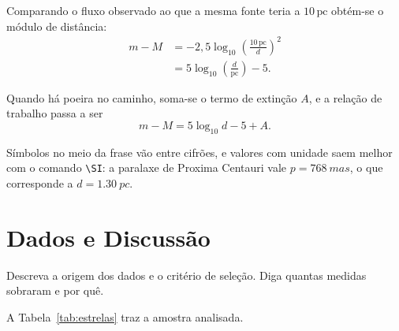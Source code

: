 \documentclass[10pt,a4paper,twocolumn]{article}
\begin{document}
Comparando o fluxo observado ao que a mesma fonte teria a $10\,\mathrm{pc}$
obtém-se o módulo de distância:
\begin{align}
    m - M &= -2{,}5\log_{10}\left(\frac{10\,\mathrm{pc}}{d}\right)^{2}
    \nonumber \\
          &= 5\log_{10}\left(\frac{d}{\mathrm{pc}}\right) - 5.
    \label{eq:modulo}
\end{align}

Quando há poeira no caminho, soma-se o termo de extinção $A$, e a relação
de trabalho passa a ser
\begin{equation*}
    m - M = 5\log_{10}d - 5 + A .
\end{equation*}

Símbolos no meio da frase vão entre cifrões, e valores com unidade saem
melhor com o comando \verb|\SI|: a paralaxe de Proxima Centauri vale
$p = \SI{768}{mas}$, o que corresponde a $d = \SI{1.30}{pc}$.

\section{Dados e Discussão}
\label{sec:dados}

Descreva a origem dos dados e o critério de seleção. Diga quantas medidas
sobraram e por quê.

A Tabela~\ref{tab:estrelas} traz a amostra analisada.
\end{document}
